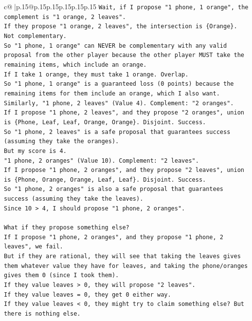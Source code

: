 \documentclass{article}
\begin{document}
{\begin{supertabular}{c@{$\;$}|p{.15\linewidth}@{}p{.15\linewidth}p{.15\linewidth}p{.15\linewidth}p{.15\linewidth}p{.15\linewidth}}
{{{\texttt{Wait, if I propose "1 phone, 1 orange", the complement is "1 orange, 2 leaves".} \\
\texttt{If they propose "1 orange, 2 leaves", the intersection is \{Orange\}. Not complementary.} \\
\texttt{So "1 phone, 1 orange" can NEVER be complementary with any valid proposal from the other player because the other player MUST take the remaining items, which include an orange.} \\
\texttt{If I take 1 orange, they must take 1 orange. Overlap.} \\
\texttt{So "1 phone, 1 orange" is a guaranteed loss (0 points) because the remaining items for them include an orange, which I also want.} \\
\texttt{Similarly, "1 phone, 2 leaves" (Value 4). Complement: "2 oranges".} \\
\texttt{If I propose "1 phone, 2 leaves", and they propose "2 oranges", union is \{Phone, Leaf, Leaf, Orange, Orange\}. Disjoint. Success.} \\
\texttt{So "1 phone, 2 leaves" is a safe proposal that guarantees success (assuming they take the oranges).} \\
\texttt{But my score is 4.} \\
\texttt{"1 phone, 2 oranges" (Value 10). Complement: "2 leaves".} \\
\texttt{If I propose "1 phone, 2 oranges", and they propose "2 leaves", union is \{Phone, Orange, Orange, Leaf, Leaf\}. Disjoint. Success.} \\
\texttt{So "1 phone, 2 oranges" is also a safe proposal that guarantees success (assuming they take the leaves).} \\
\texttt{Since 10 > 4, I should propose "1 phone, 2 oranges".} \\
\\ 
\texttt{What if they propose something else?} \\
\texttt{If I propose "1 phone, 2 oranges", and they propose "1 phone, 2 leaves", we fail.} \\
\texttt{But if they are rational, they will see that taking the leaves gives them whatever value they have for leaves, and taking the phone/oranges gives them 0 (since I took them).} \\
\texttt{If they value leaves > 0, they will propose "2 leaves".} \\
\texttt{If they value leaves = 0, they get 0 either way.} \\
\texttt{If they value leaves < 0, they might try to claim something else? But there is nothing else.} \\
}}}
\end{supertabular}}
\end{document}
